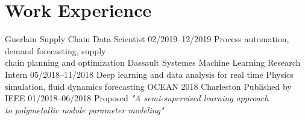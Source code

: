 \documentclass[]{source}
\begin{document}
\section{Work Experience} 

\begin{entrylist}
\medskip
  \entry
  	{\footnotesize{Guerlain}}
    {Supply Chain Data Scientist}
    {02/2019–12/2019}
    {Process automation, demand forecasting, supply \\
    chain planning and optimization}
\medskip
  \entry
  	{\footnotesize{Dassault Systemes}}
    {Machine Learning Research Intern}
    {05/2018–11/2018}
    {Deep learning and data analysis for real time Physics\\
     simulation, fluid dynamics forecasting}
  \entry
  	{\footnotesize{OCEAN 2018 Charleston}}
    {Published by IEEE}
    {01/2018–06/2018}
    {Proposed \textit{"A semi-supervised learning approach\\
     to polymetallic nodule parameter modeling"}}
\end{entrylist}

\vspace{0.2cm}
\end{document}
